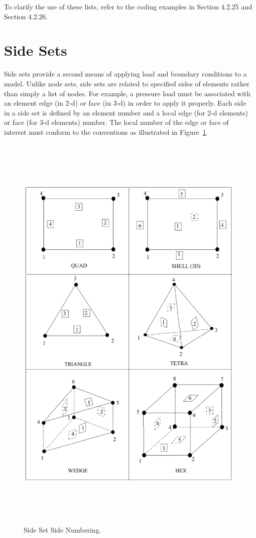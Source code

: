 To clarify the use of these lists, refer to the coding examples 
in  Section 4.2.25 and  Section 4.2.26.

\section{Side Sets}

Side sets provide a second means of applying load and boundary
conditions to a model. Unlike node sets, side sets are related to
specified sides of elements rather than simply a list of nodes. For
example, a pressure load must be associated with an element edge (in
2-d) or face (in 3-d) in order to apply it properly. Each side in a
side set is defined by an element number and a local edge (for 2-d
elements) or face (for 3-d elements) number. The local number of the
edge or face of interest must conform to the conventions as
illustrated in Figure~\ref{f:SideSetNumbering}.
\begin{figure}[htbp]
\begin{center}
\includegraphics[width=6.250in, height=8.000in]{figures/SideSetNumbering.png}
\caption{Side Set Side Numbering.}\label{f:SideSetNumbering}
\end{center}
\end{figure}


